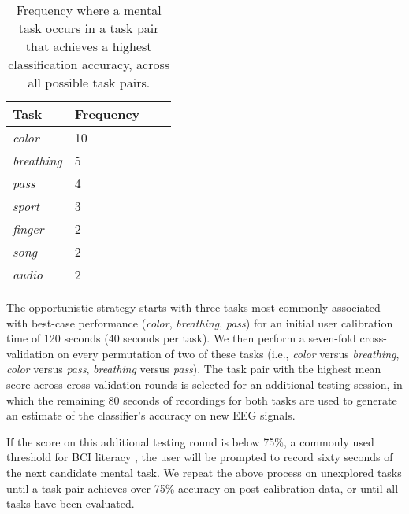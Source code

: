 \begin{table}[!h]
  \centering
  \begin{tabular}{ | l | l | l | p{5cm} |}
  \hline
  Task & Frequency \\ \hline
  \textit{color} & 10 \\ \hline
  \textit{breathing} & 5 \\ \hline
  \textit{pass} & 4 \\ \hline
  \textit{sport} & 3 \\ \hline
  \textit{finger} & 2 \\ \hline
  \textit{song} & 2 \\ \hline
  \textit{audio} & 2 \\ \hline
  \end{tabular}
  \caption{Frequency where a mental task occurs in a task pair that achieves a highest classification accuracy, across all possible task pairs.}
  \label{table:name}
\end{table}

The opportunistic strategy starts with three tasks most commonly associated with best-case performance (\textit{color}, \textit{breathing}, \textit{pass}) for an initial user calibration time of 120 seconds (40 seconds per task). We then perform a seven-fold cross-validation on every permutation of two of these tasks (i.e., \textit{color} versus \textit{breathing}, \textit{color} versus \textit{pass}, \textit{breathing} versus \textit{pass}). The task pair with the highest mean score across cross-validation rounds is selected for an additional testing session, in which the remaining 80 seconds of recordings for both tasks are used to generate an estimate of the classifier's accuracy on new EEG signals.

If the score on this additional testing round is below 75\%, a commonly used threshold for BCI literacy \cite{vidaurre_towards_2010}, the user will be prompted to record sixty seconds of the next candidate mental task. We repeat the above process on unexplored tasks until a task pair achieves over 75\% accuracy on post-calibration data, or until all tasks have been evaluated.

